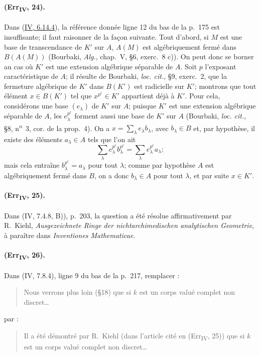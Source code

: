 \paragraph{(Err\textsubscript{IV}, 24).}
Dans ({\hyperref[canon-index.ega4.c04.prop.6-14-4]{IV, 6.14.4}}), la référence
donnée ligne 12 du bas de la p.~175 est insuffisante; il faut raisonner
de la façon suivante. Tout d'abord, si $M$ est une base de transcendance
de $K'$ sur $A$, $A(M)$ est algébriquement fermé dans $B(A(M))$
(Bourbaki, \emph{Alg.}, chap.~V, \S6, exerc.~8 c)). On peut donc se
borner au cas où $K'$ est une extension algébrique séparable de $A$.
Soit $p$ l'exposant caractéristique de $A$; il résulte de Bourbaki,
\emph{loc. cit.}, \S9, exerc.~2, que la fermeture algébrique de $K'$
dans $B(K')$ est radicielle sur $K'$; montrons que tout élément
$x\in B(K')$ tel que $x^{p^r}\in K'$ appartient déjà à $K'$. Pour cela,
considérons une base $(e_\lambda)$ de $K'$ sur $A$; puisque $K'$ est une
extension algébrique séparable de $A$, les $e_\lambda^{p^r}$ forment
aussi une base de $K'$ sur $A$ (Bourbaki, \emph{loc. cit.}, \S8,
n\textsuperscript{o}~3, cor. de la prop.~4). On a
$x=\sum_\lambda e_\lambda b_\lambda$, avec $b_\lambda\in B$ et, par
hypothèse, il existe des éléments $a_\lambda\in A$ tels que l'on ait
\[
 \sum_\lambda e_\lambda^{p^r}b_\lambda^{p^r}=
 \sum_\lambda e_\lambda^{p^r}a_\lambda;
\]
mais cela entraîne $b_\lambda^{p^r}=a_\lambda$ pour tout $\lambda$;
comme par hypothèse $A$ est algébriquement fermé dans $B$, on a donc
$b_\lambda\in A$ pour tout $\lambda$, et par suite $x\in K'$.

\paragraph{(Err\textsubscript{IV}, 25).}
Dans (IV, 7.4.8, B)), p.~203, la question a été résolue affirmativement
par R.~Kiehl, \emph{Ausgezeichnete Ringe der nichtarchimedischen
analytischen Geometrie}, à paraître dans \emph{Inventiones
Mathematicae}.

\paragraph{(Err\textsubscript{IV}, 26).}
Dans (IV, 7.8.4), ligne 9 du bas de la p.~217, remplacer :
\begin{quote}
Nous verrons plus loin (\S18) que si $k$ est un corps valué complet non
discret\ldots
\end{quote}
par :
\begin{quote}
Il a été démontré par R.~Kiehl (dans l'article cité en
(Err\textsubscript{IV}, 25)) que si $k$ est un corps valué complet non
discret\ldots
\end{quote}


